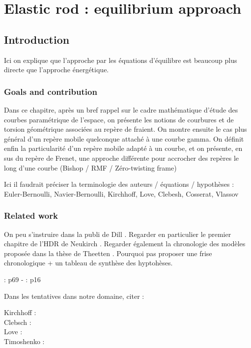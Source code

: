 \chapter{Elastic rod : equilibrium approach}

\section{Introduction}
Ici on explique que l'approche par les équations d'équilibre est beaucoup plus directe que l'approche énergétique.

\subsection{Goals and contribution}
Dans ce chapitre, après un bref rappel sur le cadre mathématique d'étude des courbes paramétrique de l'espace, on présente les notions de courbures et de torsion géométrique associées au repère de fraient. On montre ensuite le cas plus général d'un repère mobile quelconque attaché à une courbe gamma. On définit enfin la particularité d'un repère mobile adapté à un courbe, et on présente, en sus du repère de Frenet, une approche différente pour accrocher des repères le long d'une courbe (Bishop / RMF / Zéro-twisting frame)

Ici il faudrait préciser la terminologie des auteurs / équations / hypothèses :
Euler-Bernoulli, Navier-Bernoulli, Kirchhoff, Love, Clebesh, Cosserat, Vlassov

\subsection{Related work}
On peu s'instruire dans la publi de Dill \cite{Dill1992}.
Regarder en particulier le premier chapitre de l'HDR de Neukirch \cite{Neukirch2009}.
Regarder également la chronologie des modèles proposée dans la thèse de Theetten \cite{Theetten2007}.
Pourquoi pas proposer une frise chronologique + un tableau de synthèse des hyptohèses.

\cite{Dill1992}
\citet{Neukirch2009}
\cite{Adriaenssens1999}
\cite{Hoogenboom2006}
\cite{Lang2009}
\cite{Spillmann2008}
\cite{Antman2005}

\cite{Neukirch2009} : p69 - \cite{Dill1992} : p16

Dans les tentatives dans notre domaine, citer :

Kirchhoff : \cite{Kirchhoff1850, Kirchhoff1876} \\
Clebsch : \cite{Clebsch1883} \\
Love : \cite{Love1892} \\
Timoshenko : \cite{Timoshenko1921, Timoshenko1922, Timoshenko1951}

